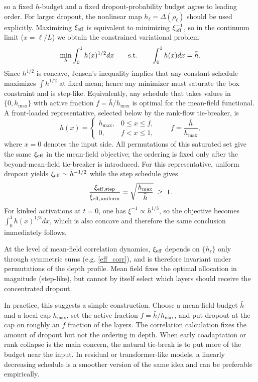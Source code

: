 \documentclass{article}
\theoremstyle{plain}
\theoremstyle{definition}
\theoremstyle{remark}
\begin{document}
\relax
so a fixed \(h\)-budget and a fixed dropout-probability budget agree to leading order. For larger dropout, the nonlinear map \(h_\ell=\Delta(\rho_\ell)\) should be used explicitly.
Maximizing $\xi_{\rm eff}$ is equivalent to minimizing $\xi_{\rm eff}^{-1}$, so in the continuum limit ($x=\ell/L$) we obtain the constrained variational problem
\relax
\begin{equation}
\min_{h}\int_0^1 h(x)^{1/2} dx \qquad {\rm s.t.}\qquad \int_0^1 h(x) dx=\bar h.
\end{equation}
\relax
Since $h^{1/2}$ is concave, Jensen's inequality implies that any constant schedule maximizes $\int h^{1/2}$ at fixed mean; hence any minimizer must saturate the box constraint and is step-like. Equivalently, any schedule that takes values in \(\{0,h_{\max}\}\) with active fraction \(f=\bar h/h_{\max}\) is optimal for the mean-field functional. A front-loaded representative, selected below by the rank-flow tie-breaker, is
\relax
\begin{equation}
h(x)= \begin{cases} h_{\max}, & 0\le x\le f,\\
0, & f<x\le 1, \end{cases} \qquad f=\frac{\bar h}{h_{\max}},
\end{equation}
\relax
where \(x=0\) denotes the input side. All permutations of this saturated set give the same \(\xi_{\rm eff}\) in the mean-field objective; the ordering is fixed only after the beyond-mean-field tie-breaker is introduced. For this representative, uniform dropout yields $\xi_{\rm eff}\sim \bar h^{-1/2}$ while the step schedule gives
\relax
\begin{equation}
\frac{\xi_{\rm eff,step}}{\xi_{\rm eff,uniform}} = \sqrt{\frac{h_{\max}}{\bar h}} \;\ge\; 1.
\end{equation}
\relax
For kinked activations at $t=0$, one has $\xi^{-1}\propto h^{1/3}$, so the objective becomes $\int_0^1 h(x)^{1/3}dx$, which is also concave and therefore the same conclusion immediately follows. 

At the level of mean-field correlation dynamics, $\xi_{\rm eff}$ depends on $\{h_\ell\}$ only through symmetric sums (e.g. \eqref{eff_corr}), and is therefore invariant under permutations of the depth profile. Mean field fixes the optimal allocation in magnitude (step-like), but cannot by itself select which layers should receive the concentrated dropout.

In practice, this suggests a simple construction. Choose a mean-field budget $\bar h$ and a local cap $h_{\max}$, set the active fraction \(f=\bar h/h_{\max}\), and put dropout at the cap on roughly an \(f\) fraction of the layers. The correlation calculation fixes the amount of dropout but not the ordering in depth. When early coadaptation or rank collapse is the main concern, the natural tie-break is to put more of the budget near the input. In residual or transformer-like models, a linearly decreasing schedule is a smoother version of the same idea and can be preferable empirically.
\end{document}

